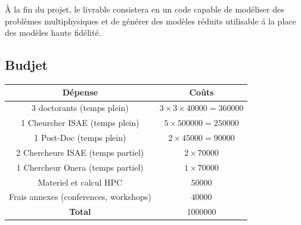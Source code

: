 \documentclass[french]{article}
\begin{document}
\`A la fin du projet, le livrable consistera en un code capable de modéliser des problèmes multiphysiques et de générer des modèles réduits utilisable \'a la place des modèles haute fidélité.  

\subsection{Budjet}
\begin{center}
\begin{tabular}{|c|c|}
	\hline
	D\'epense & Co\^{u}ts \\
	\hline
	3 doctorants (temps plein) & $3\times 3\times 40000=360000$  \\
	1 Cheurcher ISAE (temps plein) & $5\times 500000=250000$ \\
	1 Post-Doc (temps plein) & $2\times 45000=90000$ \\
	2 Chercheurs ISAE (temps partiel)& $2\times 70000$ \\
	1 Chercheur Onera (temps partiel)& $1\times 70000$ \\
	Materiel  et calcul HPC & $50000$ \\
	Frais annexes (conferences, workshops) & $40000$ \\
	\hline
	\textbf{Total} & 1000000 \\
	\hline
\end{tabular}
\end{center}






\end{document}

